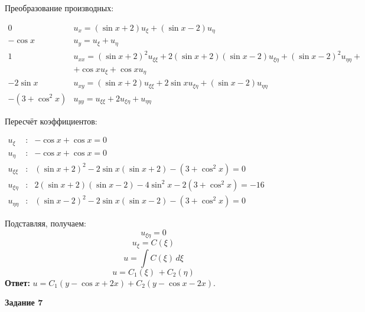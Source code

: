 \documentclass[a4paper,12pt]{article}
\begin{document}
Преобразование производных:
\begin{flushleft}
\(
\begin{array}{r|l}
0 & u_x = (\sin{x} + 2) u_{\xi} + (\sin{x} - 2) u_{\eta} \\
-\cos x & u_y = u_{\xi} + u_{\eta} \\
1 & u_{xx} = (\sin{x} + 2)^2 u_{\xi\xi} + 2(\sin{x} + 2)(\sin{x} - 2) u_{\xi\eta} + (\sin{x} - 2)^2u_{\eta\eta} + \\ & + \cos x u_{\xi} + \cos x u_{\eta}\\
-2 \sin x & u_{xy} = (\sin{x} + 2) u_{\xi\xi} + 2\sin{x} u_{\xi\eta} + (\sin{x} - 2) u_{\eta\eta}  \\
-(3+\cos^2 x) & u_{yy} = u_{\xi\xi} + 2 u_{\xi\eta} + u_{\eta\eta}
\end{array}
\)
\end{flushleft}

Пересчёт коэффициентов:
\begin{flushleft}
\(
\begin{array}{rcl}
    u_{\xi} &:& -\cos x + \cos x = 0 \\
    u_{\eta} &:& -\cos x + \cos x = 0  \\
    u_{\xi\xi} &:& (\sin{x} + 2)^2 - 2\sin{x} (\sin{x} + 2) - (3 + \cos^2{x})=0 \\
    u_{\xi\eta} &:& 2(\sin{x} + 2)(\sin{x} - 2) - 4\sin^2{x} - 2(3 +\cos^2{x})=-16\\
    u_{\eta\eta} &:& (\sin{x} - 2)^2 - 2\sin{x} (\sin{x} - 2) - (3 + \cos^2{x})=0
\end{array}
\)
\end{flushleft}

Подставляя, получаем:
\begin{equation*}
    u_{\xi\eta} = 0
\end{equation*}
\begin{equation*}
    u_{\xi} = C(\xi)
\end{equation*}
\begin{equation*}
    u = \int C(\xi) \, d\xi
\end{equation*}
\begin{equation*}
    u = C_1(\xi) \, + C_2(\eta)
\end{equation*}
\textbf{Ответ:} $u = C_1(y - \cos{x} + 2x) + C_2(y - \cos{x} - 2x)$.

\vspace{100mm}
\vspace{100mm}
\vspace{20mm}
\begin{center}    
\noindent \textbf{Задание 7}
\end{center}
\end{document}
